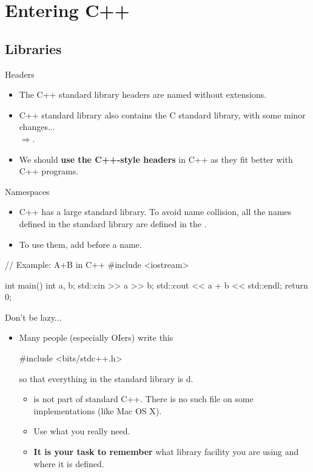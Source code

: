 \documentclass{beamer}
\begin{document}
\section{Entering C++}

\subsection{Libraries}

\begin{frame}{Headers}
    \begin{itemize}
        \item The C++ standard library headers are named without extensions.
        \item C++ standard library also contains the C standard library, with some minor changes...\\
        \quad\(\Longrightarrow\)\quad{}.
        \item We should \textbf{use the C++-style headers} in C++ as they fit better with C++ programs.
    \end{itemize}
\end{frame}

\begin{frame}[fragile]{Namespaces}
    \begin{itemize}
        \item C++ has a large standard library. To avoid name collision, all the names defined in the standard library are defined in the .
        \item To use them, add before a name.
    \end{itemize}
    \pause
    \begin{cpp}
// Example: A+B in C++
#include <iostream>

int main() {
  int a, b;
  std::cin >> a >> b;
  std::cout << a + b << std::endl;
  return 0;
}
    \end{cpp}
\end{frame}

\begin{frame}[fragile]{Don't be lazy...}
    \begin{itemize}
        \item Many people (especially OIers) write this
        \begin{cpp}
#include <bits/stdc++.h>
        \end{cpp}
        so that everything in the standard library is d.
        \pause
        \begin{itemize}
            \item {} is not part of standard C++. There is no such file on some implementations (like Mac OS X).
            \item Use what you really need.
            \item \textbf{It is your task to remember} what library facility you are using and where it is defined.
        \end{itemize}
    \end{itemize}
\end{frame}
\end{document}
